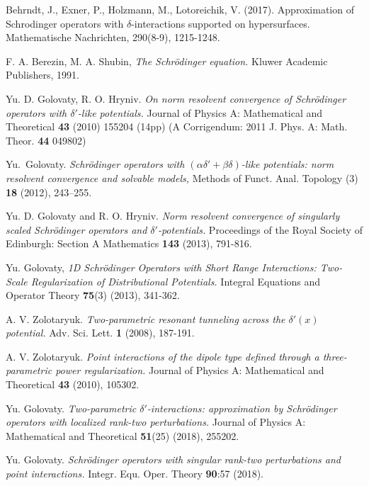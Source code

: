 \documentclass[reqno]{amsart}
\theoremstyle{plain}
\numberwithin{equation}{section}
\begin{document}
\begin{thebibliography}{10}
Behrndt, J., Exner, P., Holzmann, M.,  Lotoreichik, V. (2017). Approximation of Schrodinger operators with $\delta$-interactions supported on hypersurfaces. Mathematische Nachrichten, 290(8-9), 1215-1248.


 F. A. Berezin, M. A. Shubin,
\textit{The Schr\"{o}dinger equation.} Kluwer Academic
Publishers, 1991.

    Yu. D. Golovaty,  R. O. Hryniv.
    \textit{On norm resolvent convergence of Schr\"{o}dinger
    operators with $\delta'$-like potentials.}
   Journal of Physics A: Mathematical and Theoretical \textbf{43} (2010) 155204 (14pp) (A Corrigendum: 2011 J. Phys. A: Math. Theor. \textbf{44} 049802)

    Yu.~Golovaty.
    \textit{Schr\"{o}dinger operators with  $(\alpha\delta'+\beta \delta)$-like potentials: norm resolvent convergence and solvable models,} Methods of Funct. Anal. Topology (3) \textbf{18} (2012), 243--255.

 Yu. D. Golovaty and R. O. Hryniv. \textit{Norm resolvent convergence of singularly scaled Schr\"{o}dinger operators and $\delta'$-potentials.} Proceedings of the Royal Society of Edinburgh: Section A Mathematics \textbf{143} (2013),  791-816.

    Yu. Golovaty, \textit{1D Schr\"{o}dinger Operators with Short Range Interactions: Two-Scale Regularization of Distributional Potentials.} Integral Equations and Operator Theory \textbf{75}(3) (2013),   341-362.


    A. V. Zolotaryuk.
    \textit{Two-parametric resonant tunneling across the $\delta'(x)$ potential.}
    Adv. Sci. Lett. {\bf 1} (2008), 187-191.

    A. V. Zolotaryuk.
    \textit{Point interactions of the dipole type defined through a three-parametric power regularization.}
    Journal of Physics A: Mathematical and Theoretical {\bf 43} (2010), 105302.

	Yu. Golovaty.
	\textit{Two-parametric  $\delta'$-interactions: approximation by
 	Schr\"{o}dinger operators with localized rank-two perturbations.}
 	Journal of Physics A: Mathematical and Theoretical \textbf{51}(25) (2018), 255202.

	Yu. Golovaty.
	\textit{Schr\"{o}dinger operators with singular rank-two perturbations and point interactions.}
	Integr. Equ. Oper. Theory \textbf{90}:57 (2018).
\end{thebibliography}
\end{document}
